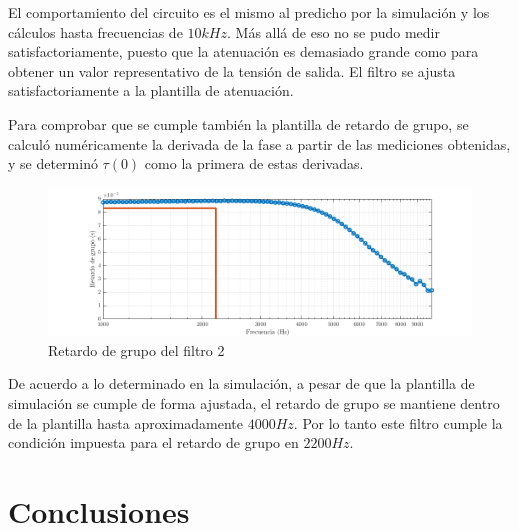 \documentclass[../../tc_tp5_main.tex]{subfiles}
\begin{document}
El comportamiento del circuito es el mismo al predicho por la simulaci\'on y los c\'alculos hasta frecuencias de $10kHz$. M\'as all\'a de eso no se pudo medir satisfactoriamente, puesto que la atenuaci\'on es demasiado grande como para obtener un valor representativo de la tensi\'on de salida. El filtro se ajusta satisfactoriamente a la plantilla de atenuaci\'on.\par

Para comprobar que se cumple tambi\'en la plantilla de retardo de grupo, se calcul\'o num\'ericamente la derivada de la fase a partir de las mediciones obtenidas, y se determin\'o $\tau(0)$ como la primera de estas derivadas. 

\begin{figure}[H]
	\centering
	\includegraphics[scale=0.7]{imagenes/tc_tp5_ej1_gd.png}
	\caption{Retardo de grupo del filtro 2}
\end{figure}

De acuerdo a lo determinado en la simulaci\'on, a pesar de que la plantilla de simulaci\'on se cumple de forma ajustada, el retardo de grupo se mantiene dentro de la plantilla hasta aproximadamente $4000Hz$. Por lo tanto este filtro cumple la condici\'on impuesta para el retardo de grupo en $2200Hz$.

\section{Conclusiones}
\end{document}
